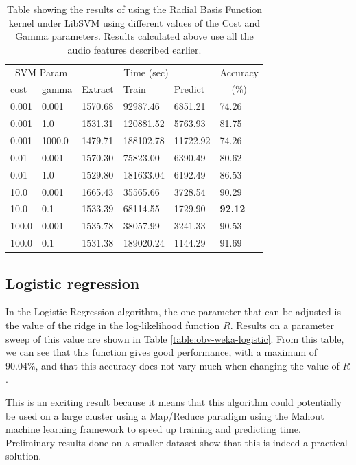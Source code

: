 \begin{table}
\begin{tabular}{|l|l|l|l|l|l|}
\hline
\multicolumn{2}{|c|}{SVM Param} & \multicolumn{3}{c|}{Time (sec)} & Accuracy \\
\hhline{|-|-|-|-|-|~|}
cost & gamma & Extract & Train & Predict & \multicolumn{1}{c|}{(\%)} \\
\hhline{|=|=|=|=|=|=|}
 0.001  & 0.001   &  1570.68  &   92987.46  &   6851.21  &  74.26  \\
 0.001  & 1.0     &  1531.31  &  120881.52  &   5763.93  &  81.75  \\
 0.001  & 1000.0  &  1479.71  &  188102.78  &  11722.92  &  74.26  \\
 0.01   & 0.001   &  1570.30  &   75823.00  &   6390.49  &  80.62  \\
 0.01   & 1.0     &  1529.80  &  181633.04  &   6192.49  &  86.53  \\
 10.0   & 0.001   &  1665.43  &   35565.66  &   3728.54  &  90.29  \\
 10.0   & 0.1     &  1533.39  &   68114.55  &   1729.90  &  \textbf{92.12}  \\
 100.0  & 0.001   &  1535.78  &   38057.99  &   3241.33  &  90.53  \\
 100.0  & 0.1     &  1531.38  &  189020.24  &   1144.29  &  91.69  \\
\hline
\end{tabular}
\caption{Table showing the results of using the Radial Basis Function
  kernel under LibSVM using different values of the Cost and Gamma
  parameters.  Results calculated above use all the audio features
  described earlier.}
\label{table:obv-libsvm-rbf}
\end{table}



%
%
\subsection{Logistic regression}


In the Logistic Regression algorithm, the one parameter that can be
adjusted is the value of the ridge in the log-likelihood function $R$.
Results on a parameter sweep of this value are shown in Table
\ref{table:obv-weka-logistic}.  From this table, we can see that this
function gives good performance, with a maximum of 90.04\%, and that
this accuracy does not vary much when changing the value of $R$.

This is an exciting result because it means that this algorithm could
potentially be used on a large cluster using a Map/Reduce paradigm
using the Mahout \cite{owen2011mahout} machine learning framework to
speed up training and predicting time.  Preliminary results done on a
smaller dataset show that this is indeed a practical solution.

